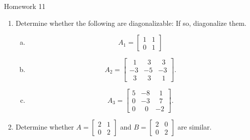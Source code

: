 \documentclass[10pt, aspectratio=169]{beamer}
\begin{document}
\begin{frame}{Homework 11}

\begin{enumerate}
    \item Determine whether the following are diagonalizable: If so, diagonalize them.
    \begin{enumerate}[a)]
        \item \[A_1 =\begin{bmatrix} 1 & 1\\ 0 & 1 \end{bmatrix}\]

        \item \[ A_2 = \begin{bmatrix}
            \;\;1 & \;\;3 &\;\; 3 \\
            -3 & -5 & -3 \\
            \;\;3 & \;\;3 & \;\;1
            \end{bmatrix}.\]
    
        \item \[A_3 = \begin{bmatrix}
            5 & -8 &\;\; 1 \\
            0 & -3 & \;\;7 \\
            0 & \;\;0 & -2
    \end{bmatrix}.\] 
    \end{enumerate}
    \item Determine whether
    \(A =\begin{bmatrix} 2 & 1\\ 0 & 2 \end{bmatrix}\) and 
    \(B =\begin{bmatrix} 2 & 0\\ 0 & 2 \end{bmatrix}\) are similar.
\end{enumerate}
\end{frame}


    
\end{document}
